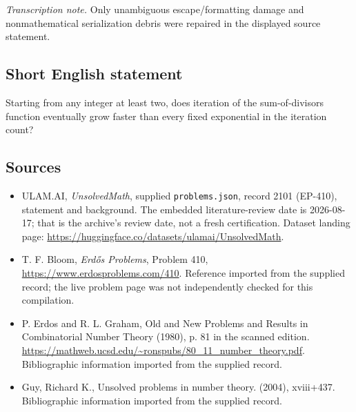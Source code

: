 \documentclass[11pt,a4paper]{article}
\begin{document}
{\small\emph{Transcription note.} Only unambiguous escape/formatting damage and nonmathematical serialization debris were repaired in the displayed source statement.}

\subsection{Short English statement}

Starting from any integer at least two, does iteration of the sum-of-divisors function eventually grow faster than every fixed exponential in the iteration count?

\subsection{Sources}

{\small

\begin{itemize}

\item[\hypertarget{source:2101:1}{S1}] ULAM.AI, \emph{UnsolvedMath}, supplied \texttt{problems.json}, record 2101 (EP-410), statement and background. The embedded literature-review date is 2026-08-17; that is the archive’s review date, not a fresh certification. Dataset landing page: \url{https://huggingface.co/datasets/ulamai/UnsolvedMath}.

\item[\hypertarget{source:2101:2}{S2}] T. F. Bloom, \emph{Erdős Problems}, Problem 410, \url{https://www.erdosproblems.com/410}. Reference imported from the supplied record; the live problem page was not independently checked for this compilation.

\item[\hypertarget{source:2101:3}{S3}] P. Erdos and R. L. Graham, Old and New Problems and Results in Combinatorial Number Theory (1980), p. 81 in the scanned edition. \url{https://mathweb.ucsd.edu/~ronspubs/80_11_number_theory.pdf}. Bibliographic information imported from the supplied record.

\item[\hypertarget{source:2101:4}{S4}] Guy, Richard K., Unsolved problems in number theory. (2004), xviii+437. Bibliographic information imported from the supplied record.

\end{itemize}

}

\label{end:2101}
\end{document}
